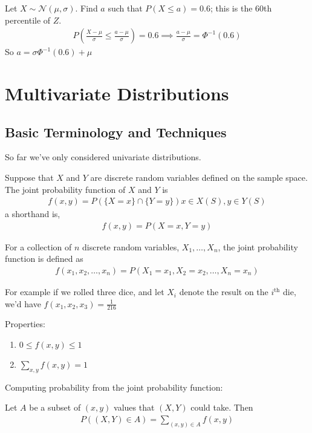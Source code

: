 \documentclass{article}
\begin{document}
Let $X \sim \mathcal{N}(\mu,\sigma)$. Find $a$ such that $P(X \le a) = 0.6$; this is the 60th percentile of $Z$. 
\begin{align*}
    P\left(\frac{X -\mu}{\sigma} \le \frac{a - \mu}{\sigma}\right) = 0.6 \implies \frac{a - \mu}{\sigma} = \Phi^{-1}(0.6)
\end{align*}
So $a = \sigma \Phi^{-1}(0.6) + \mu$



\section{Multivariate Distributions}

\subsection{Basic Terminology and Techniques}

So far we've only considered univariate distributions. 

Suppose that $X$ and $Y$ are discrete random variables defined on the sample space. The joint probability function of $X$ and $Y$ is
\begin{align*}
    f(x,y) = P(\{X = x\} \cap \{Y = y\}) x \in X(S), y \in Y(S)
\end{align*}
a shorthand is, 
\begin{align*}
    f(x,y) = P(X = x, Y =y)
\end{align*}

For a collection of $n$ discrete random variables, $X_1, \ldots, X_n$, the joint probability function is defined as
\begin{align*}
    f(x_1, x_2, \ldots, x_n) = P(X_1 = x_1, X_2 = x_2, \ldots, X_n = x_n)
\end{align*}

For example if we rolled three dice, and let $X_i$ denote the result on the $i^{\text{th}}$ die, we'd have $f(x_1, x_2, x_3) = \frac{1}{216}$

Properties:
\begin{enumerate}
    \item $0 \le f(x,y) \le 1$
    \item $\sum_{x,y}f(x,y) = 1$
\end{enumerate}

Computing probability from the joint probability function:

Let $A$ be a subset of $(x,y)$ values that $(X,Y)$ could take. Then
\begin{align*}
    P((X,Y) \in A) = \sum_{(x,y) \in A} f(x,y)
\end{align*}
\end{document}
